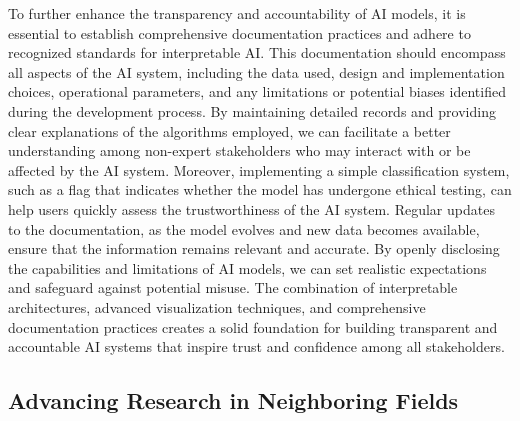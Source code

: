 \documentclass[10pt]{article}
\begin{document}
    To further enhance the transparency and accountability of AI models, it is essential to establish comprehensive documentation practices and adhere to recognized standards for interpretable AI. This documentation should encompass all aspects of the AI system, including the data used, design and implementation choices, operational parameters, and any limitations or potential biases identified during the development process. By maintaining detailed records and providing clear explanations of the algorithms employed, we can facilitate a better understanding among non-expert stakeholders who may interact with or be affected by the AI system. Moreover, implementing a simple classification system, such as a flag that indicates whether the model has undergone ethical testing, can help users quickly assess the trustworthiness of the AI system. Regular updates to the documentation, as the model evolves and new data becomes available, ensure that the information remains relevant and accurate. By openly disclosing the capabilities and limitations of AI models, we can set realistic expectations and safeguard against potential misuse. The combination of interpretable architectures, advanced visualization techniques, and comprehensive documentation practices creates a solid foundation for building transparent and accountable AI systems that inspire trust and confidence among all stakeholders.

  \subsection{Advancing Research in Neighboring Fields}
\end{document}
